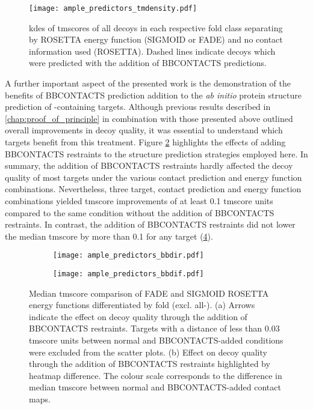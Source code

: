 \begin{figure}[H]
    \centering
    \texttt{[image: ample\_predictors\_tmdensity.pdf]}
    \caption[TM-score distribution by fold category and ROSETTA energy function]{\Gls{kde}s of \gls{tmscore}s of all decoys in each respective fold class separating by ROSETTA energy function (SIGMOID or FADE) and no contact information used (ROSETTA). Dashed lines indicate decoys which were predicted with the addition of BBCONTACTS predictions.}
    \label{fig:ample_predictor_tmdensity}
\end{figure}

A further important aspect of the presented work is the demonstration of the benefits of BBCONTACTS prediction addition to the \textit{ab initio} protein structure prediction of \textbeta-containing targets. Although previous results described in \cref{chap:proof_of_principle} in combination with those presented above outlined overall improvements in decoy quality, it was essential to understand which targets benefit from this treatment. Figure \ref{fig:ample_predictor_bbdir} highlights the effects of adding BBCONTACTS restraints to the structure prediction strategies employed here. In summary, the addition of BBCONTACTS restraints hardly affected the decoy quality of most targets under the various contact prediction and energy function combinations. Nevertheless, three target, contact prediction and energy function combinations yielded \gls{tmscore} improvements of at least 0.1 \gls{tmscore} units compared to the same condition without the addition of BBCONTACTS restraints. In contrast, the addition of BBCONTACTS restraints did not lower the median \gls{tmscore} by more than 0.1 for any target (\cref{fig:ample_predictor_bbdif}).

\begin{figure}[H]
    \centering
    \begin{subfigure}[b]{\textwidth}
        \centering
        \texttt{[image: ample\_predictors\_bbdir.pdf]}
        \caption{}
        \label{fig:ample_predictor_bbdir}
    \end{subfigure}
    
    \begin{subfigure}[b]{\textwidth}
        \centering
        \texttt{[image: ample\_predictors\_bbdif.pdf]}
        \caption{}
        \label{fig:ample_predictor_bbdif}
    \end{subfigure}

    \caption[Median TM-score analysis by fold category and ROSETTA energy function]{Median \gls{tmscore} comparison of FADE and SIGMOID ROSETTA energy functions differentiated by fold (excl. all-\textalpha). (a) Arrows indicate the effect on decoy quality through the addition of BBCONTACTS restraints. Targets with a distance of less than 0.03 \gls{tmscore} units between normal and BBCONTACTS-added conditions were excluded from the scatter plots. (b) Effect on decoy quality through the addition of BBCONTACTS restraints highlighted by heatmap difference. The colour scale corresponds to the difference in median \gls{tmscore} between normal and BBCONTACTS-added contact maps.}
\end{figure}

